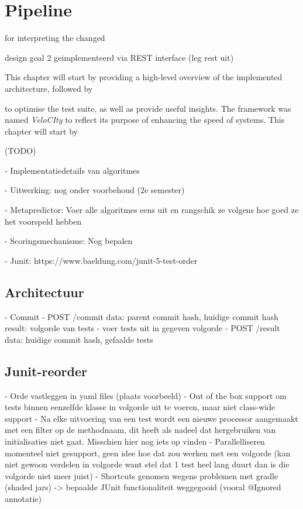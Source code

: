 
\section{Pipeline}
 for interpreting the changed 



design goal 2 geimplementeerd via REST interface (leg rest uit)


This chapter will start by providing a high-level overview of the implemented architecture, followed by 

to optimise the test suite, as well as provide useful insights. The framework was named \emph{VeloCIty} to reflect its purpose of enhancing the speed of \CI{} systems. This chapter will start by 




(TODO)

- Implementatiedetails van algoritmes

- Uitwerking: nog onder voorbehoud (2e semester)

- Metapredictor: Voer alle algoritmes eens uit en rangschik ze volgens hoe goed ze het voorspeld hebben

- Scoringsmechanisme: Nog bepalen

- Junit: https://www.baeldung.com/junit-5-test-order

\subsection{Architectuur}
- Commit
- POST /commit
data: parent commit hash, huidige commit hash
result: volgorde van tests
- voer tests uit in gegeven volgorde
- POST /result
data: huidige commit hash, gefaalde tests

\subsection{Junit-reorder}
- Orde vastleggen in yaml files (plaats voorbeeld)
- Out of the box support om tests binnen eenzelfde klasse in volgorde uit te voeren, maar niet class-wide support
- Na elke uitvoering van een test wordt een nieuwe processor aangemaakt met een filter op de methodnaam, dit heeft als nadeel dat hergebruiken van initialisaties niet gaat. Misschien hier nog iets op vinden
- Parallelliseren momenteel niet gesupport, geen idee hoe dat zou werken met een volgorde (kan niet gewoon verdelen in volgorde want stel dat 1 test heel lang duurt dan is die volgorde niet meer juist)
- Shortcuts genomen wegens problemen met gradle (shaded jars) -> bepaalde JUnit functionaliteit weggegooid (vooral @Ignored annotatie)


